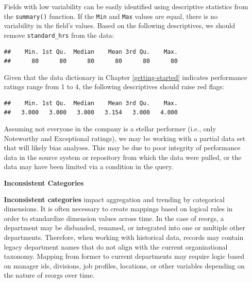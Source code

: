 \documentclass[]{book}
\newenvironment{Shaded}{\begin{snugshade}}{\end{snugshade}}
\newcommand{\CommentTok}[1]{\textcolor[rgb]{0.56,0.35,0.01}{\textit{#1}}}
\newcommand{\KeywordTok}[1]{\textcolor[rgb]{0.13,0.29,0.53}{\textbf{#1}}}
\newcommand{\NormalTok}[1]{#1}
\newcommand{\OperatorTok}[1]{\textcolor[rgb]{0.81,0.36,0.00}{\textbf{#1}}}
\begin{document}
Fields with low variability can be easily identified using descriptive statistics from the \texttt{summary()} function. If the \texttt{Min} and \texttt{Max} values are equal, there is no variability in the field's values. Based on the following descriptives, we should remove \texttt{standard\_hrs} from the data:

\begin{Shaded}
\end{Shaded}

\begin{verbatim}
##    Min. 1st Qu.  Median    Mean 3rd Qu.    Max. 
##      80      80      80      80      80      80
\end{verbatim}

Given that the data dictionary in Chapter \ref{getting-started} indicates performance ratings range from 1 to 4, the following descriptives should raise red flags:

\begin{Shaded}
\end{Shaded}

\begin{verbatim}
##    Min. 1st Qu.  Median    Mean 3rd Qu.    Max. 
##   3.000   3.000   3.000   3.154   3.000   4.000
\end{verbatim}

Assuming not everyone in the company is a stellar performer (i.e., only Noteworthy and Exceptional ratings), we may be working with a partial data set that will likely bias analyses. This may be due to poor integrity of performance data in the source system or repository from which the data were pulled, or the data may have been limited via a condition in the query.

\textbf{Inconsistent Categories}

\textbf{Inconsistent categories} impact aggregation and trending by categorical dimensions. It is often necessary to create mappings based on logical rules in order to standardize dimension values across time. In the case of reorgs, a department may be disbanded, renamed, or integrated into one or multiple other departments. Therefore, when working with historical data, records may contain legacy department names that do not align with the current organizational taxonomy. Mapping from former to current departments may require logic based on manager ids, divisions, job profiles, locations, or other variables depending on the nature of reorgs over time.
\end{document}
